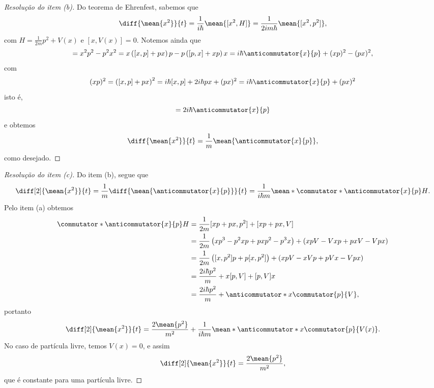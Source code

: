 \begin{proof}[Resolução do item (b)]
    Do teorema de Ehrenfest, sabemos que
    \begin{equation*}
        \diff{\mean{x^2}}{t} = \frac{1}{i\hbar} \mean{[x^2, H]} = \frac1{2i m \hbar}\mean{[x^2, p^2]},
    \end{equation*}
    com \(H = \frac{1}{2m}p^2 + V(x)\) e \([x, V(x)] = 0\). Notemos ainda que
    \begin{equation*}
        [x^2, p^2] = x^2 p^2 - p^2 x^2 = x \left([x,p] + px\right) p - p\left([p,x] + xp\right)x = i \hbar \anticommutator{x}{p} + (xp)^2 - (px)^2 ,
    \end{equation*}
    com
    \begin{equation*}
        (xp)^2 = \left([x,p] + px\right)^2 = i\hbar [x,p] +  2i\hbar px + (px)^2 = i \hbar \anticommutator{x}{p} + (px)^2
    \end{equation*}
    isto é,
    \begin{equation*}
        [x^2, p^2] = 2i\hbar \anticommutator{x}{p}
    \end{equation*}
    e obtemos
    \begin{equation*}
        \diff{\mean{x^2}}{t} = \frac{1}{m}\mean{\anticommutator{x}{p}},
    \end{equation*}
    como desejado.
\end{proof}
\begin{proof}[Resolução do item (c)]
    Do item (b), segue que
    \begin{equation*}
        \diff[2]{\mean{x^2}}{t} = \frac{1}{m} \diff{\mean{\anticommutator{x}{p}}}{t} = \frac{1}{i \hbar m} \mean*{\commutator*{\anticommutator{x}{p}}{H}}. %
    \end{equation*}
    Pelo item (a) obtemos
    \begin{align*}
        \commutator*{\anticommutator{x}{p}}{H} &= \frac1{2m}[xp + px, p^2] + [xp + px, V]\\
                                               &= \frac{1}{2m}\left(xp^3 - p^2xp + pxp^2 - p^3x\right) + \left(xpV - Vxp + pxV - Vpx\right)\\
                                               &= \frac{1}{2m}\left([x,p^2]p + p[x,p^2]\right) + \left(xpV - xVp + pVx - Vp x\right)\\
                                               &= \frac{2 i\hbar p^2}{m} + x[p, V] + [p, V]x\\
                                               &= \frac{2i \hbar p^2}{m} + \anticommutator*{x}{\commutator{p}{V}},
    \end{align*}
    portanto
    \begin{equation*}
        \diff[2]{\mean{x^2}}{t} = \frac{2\mean{p^2}}{m^2} + \frac{1}{i\hbar m} \mean*{\anticommutator*{x}{\commutator{p}{V(x)}}}.
    \end{equation*}
    No caso de partícula livre, temos \(V(x) = 0\), e assim
    \begin{equation*}
        \diff[2]{\mean{x^2}}{t} = \frac{2\mean{p^2}}{m^2},
    \end{equation*}
    que é constante para uma partícula livre.
\end{proof}
